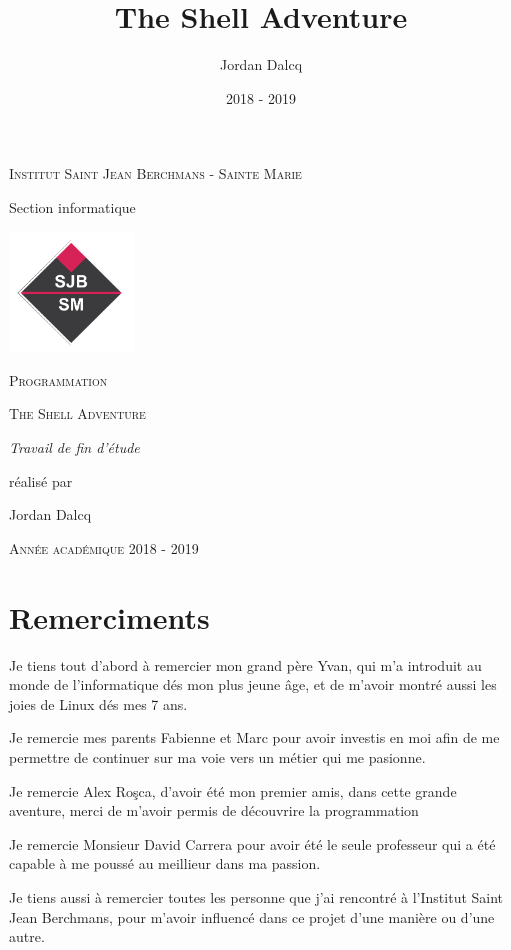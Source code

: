 \documentclass{report}
\begin{document}
\begin{titlepage}
  \centering
  {\scshape Institut Saint Jean Berchmans - Sainte Marie\par\vspace{0.2cm} Section informatique\par \vspace{0.2cm}}
  \vspace{1cm}
  \includegraphics[width=0.25\textwidth]{img/image2}\par\vspace{1cm}
  {\scshape \LARGE Programmation \par}
  \vspace{0.2cm}
	{\scshape \Large The Shell Adventure\par}
  \vspace{3cm}
  {\Large\itshape Travail de fin d'étude \par réalisé par \par Jordan Dalcq \par}
  \vfill
  \scshape Année académique 2018 - 2019
  \title{The Shell Adventure}
  \author{Jordan Dalcq}
  \date{2018 - 2019}
\end{titlepage}

\pagestyle{headings}
\tableofcontents
\part*{Remerciments}

Je tiens tout d'abord à remercier mon grand père Yvan, qui m'a introduit au monde de l'informatique dés mon plus jeune âge, et de m'avoir montré aussi les joies de Linux dés mes 7 ans.
\newline
\par Je remercie mes parents Fabienne et Marc pour avoir investis en moi afin de me permettre de continuer sur ma voie vers un métier qui me pasionne.
\newline
\par Je remercie Alex Roşca, d'avoir été mon premier amis, dans cette grande aventure, merci de m'avoir permis de découvrire la programmation
\newline
\par Je remercie Monsieur David Carrera pour avoir été le seule professeur qui a été capable à me poussé au meillieur dans ma passion.
\newline
\par Je tiens aussi à remercier toutes les personne que j'ai rencontré à l'Institut Saint Jean Berchmans, pour m'avoir influencé dans ce projet d'une manière ou d'une autre.
\end{document}
